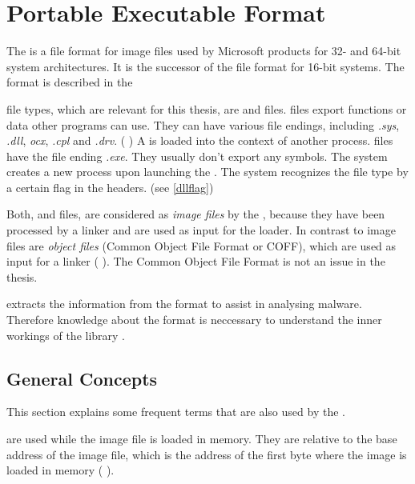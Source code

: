 \chapter{Portable Executable Format} \label{chap:peformat}

The \PE{} is a file format for image files used by Microsoft products for 32- and 64-bit system architectures. It is the successor of the \NZ{} file format for 16-bit systems. The \PE{} format is described in the \PECOFF{} \cite{pespec}

\PE{} file types, which are relevant for this thesis, are \DLL{} and \EXE{} files. \DLL{} files export functions or data other programs can use. They can have various file endings, including \emph{.sys}, \emph{.dll}, \emph{ocx}, \emph{.cpl} and \emph{.drv}. (\cf{} \cite{micrdll}) A \DLL{} is loaded into the context of another process.
\EXE{} files have the file ending \emph{.exe}. They usually don't export any symbols. The system creates a new process upon launching the \EXE{}.
The system recognizes the file type by a certain flag in the \PE{} headers. (see \ref{dllflag}) 

Both, \EXE{} and \DLL{} files, are considered as \emph{image files} by the \PECOFF{}, because they have been processed by a linker and are used as input for the loader. In contrast to image files are \emph{object files} (Common Object File Format or {COFF}), which are used as input for a linker (\cf{} \cite[]{pespec}). The Common Object File Format is not an issue in the thesis.

\portex{} extracts the information from the \PE{} format to assist in analysing malware. Therefore knowledge about the \PE{} format is neccessary to understand the inner workings of the library \portex{}. 

\section{General Concepts}


This section explains some frequent terms that are also used by the \PECOFF{}. 

\begin{definition}[RVA]
\emph{} are used while the image file is loaded in memory. They are relative to the base address of the image file, which is the address of the first byte where the image is loaded in memory (\cf{} \cite[]{pespec}).
\end{definition} 

